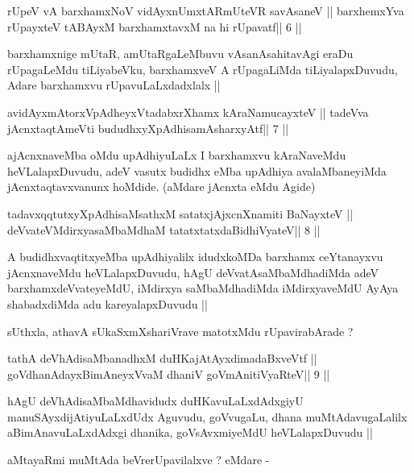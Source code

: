 
\begin{shl}
rUpeV vA barxhamxNoV vidAyxnUmxtARmUteVR savAsaneV ||
barxhemxYva rUpayxteV tABAyxM barxhamxtavxM na hi rUpavatf\hfill || 6 ||
\end{shl}

\begin{artha}
barxhamxnige mUtaR, amUtaRgaLeMbuvu vAsanAsahitavAgi eraDu rUpagaLeMdu
tiLiyabeVku, barxhamxveV A rUpagaLiMda tiLiyalapxDuvudu, Adare
barxhamxvu rUpavuLaLxdadxlalx ||
\end{artha}



\begin{shl}
avidAyxmAtorxVpAdheyxVtadabxrXhamx kAraNamucayxteV ||
tadeVva jAcnxtaqtAmeVti bududhxyXpAdhisamAsharxyAtf\hfill || 7 ||
\end{shl}

\begin{artha}
ajAcnxnaveMba oMdu upAdhiyuLaLx I barxhamxvu kAraNaveMdu
heVLalapxDuvudu, adeV vasutx budidhx eMba upAdhiya avalaMbaneyiMda
jAcnxtaqtavxvanunx hoMdide. (aMdare jAcnxta eMdu Agide)
\end{artha}



\begin{shl}
tadavxqqtutxyXpAdhisaMsathxM satatxjAjxcnXnamiti BaNayxteV ||
deVvateVMdirxyasaMbaMdhaM tatatxtatxdaBidhiVyateV\hfill || 8 ||
\end{shl}

\begin{artha}
A budidhxvaqtitxyeMba upAdhiyalilx idudxkoMDa barxhamx ceYtanayxvu
jAcnxnaveMdu heVLalapxDuvudu, hAgU deVvatAsaMbaMdhadiMda adeV
barxhamxdeVvateyeMdU, iMdirxya saMbaMdhadiMda iMdirxyaveMdU AyAya
shabadxdiMda adu kareyalapxDuvudu ||

sUthxla, athavA sUkaSxmXshariVrave matotxMdu rUpavirabArade ?
\end{artha}

\begin{shl}
tathA deVhAdisaMbanadhxM duHKajAtAyxdimadaBxveVtf ||
goVdhanAdayxBimAneyxVvaM dhaniV goVmAnitiVyaRteV\hfill || 9 ||
\end{shl}

\begin{artha}
hAgU deVhAdisaMbaMdhavidudx duHKavuLaLxdAdxgiyU
manuSAyxdijAtiyuLaLxdUdx Aguvudu, goVvugaLu, dhana muMtAdavugaLalilx
aBimAnavuLaLxdAdxgi dhanika, goVsAvxmiyeMdU heVLalapxDuvudu || 

aMtayaRmi muMtAda beVrerUpavilalxve ? eMdare -
\end{artha}

